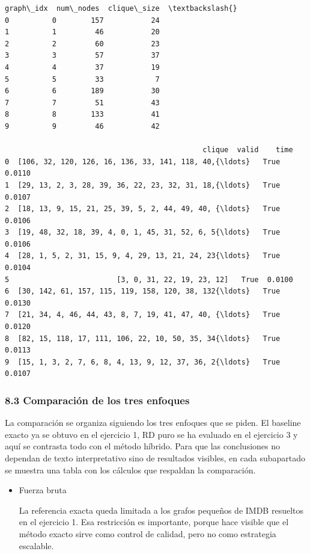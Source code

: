 \documentclass[11pt]{article}
\begin{document}
    \begin{Verbatim}[commandchars=\\\{\}]
   graph\_idx  num\_nodes  clique\_size  \textbackslash{}
0          0        157           24   
1          1         46           20   
2          2         60           23   
3          3         57           37   
4          4         37           19   
5          5         33            7   
6          6        189           30   
7          7         51           43   
8          8        133           41   
9          9         46           42   

                                              clique  valid    time  
0  [106, 32, 120, 126, 16, 136, 33, 141, 118, 40,{\ldots}   True  0.0110  
1  [29, 13, 2, 3, 28, 39, 36, 22, 23, 32, 31, 18,{\ldots}   True  0.0107  
2  [18, 13, 9, 15, 21, 25, 39, 5, 2, 44, 49, 40, {\ldots}   True  0.0106  
3  [19, 48, 32, 18, 39, 4, 0, 1, 45, 31, 52, 6, 5{\ldots}   True  0.0106  
4  [28, 1, 5, 2, 31, 15, 9, 4, 29, 13, 21, 24, 23{\ldots}   True  0.0104  
5                         [3, 0, 31, 22, 19, 23, 12]   True  0.0100  
6  [30, 142, 61, 157, 115, 119, 158, 120, 38, 132{\ldots}   True  0.0130  
7  [21, 34, 4, 46, 44, 43, 8, 7, 19, 41, 47, 40, {\ldots}   True  0.0120  
8  [82, 15, 118, 17, 111, 106, 22, 10, 50, 35, 34{\ldots}   True  0.0113  
9  [15, 1, 3, 2, 7, 6, 8, 4, 13, 9, 12, 37, 36, 2{\ldots}   True  0.0107  
    \end{Verbatim}

    
    \subsubsection{8.3 Comparación de los tres
enfoques}\label{comparaciuxf3n-de-los-tres-enfoques}

La comparación se organiza siguiendo los tres enfoques que se piden. El
baseline exacto ya se obtuvo en el ejercicio 1, RD puro se ha evaluado
en el ejercicio 3 y aquí se contrasta todo con el método híbrido. Para
que las conclusiones no dependan de texto interpretativo sino de
resultados visibles, en cada subapartado se muestra una tabla con los
cálculos que respaldan la comparación.

    \begin{itemize}
\item
  Fuerza bruta

  La referencia exacta queda limitada a los grafos pequeños de IMDB
  resueltos en el ejercicio 1. Esa restricción es importante, porque
  hace visible que el método exacto sirve como control de calidad, pero
  no como estrategia escalable.
\end{itemize}
\end{document}
